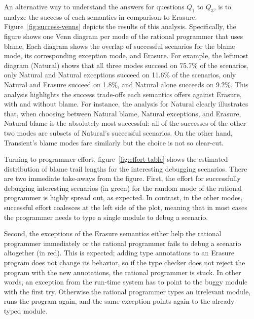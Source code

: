 An alternative way to understand the answers for questions $Q_1$ to $Q_3$, is to
analyze the success of each semantics in comparison to
Erasure. Figure~\ref{fig:success-venns} depicts the results of this analysis.
Specifically, the figure shows one Venn diagram per mode of the rational
programmer that uses blame.  Each diagram shows the overlap of successful
scenarios for the blame mode, its corresponding exception mode, and Erasure.
For example, the leftmost diagram (Natural) shows that all three modes succeed
on 75.7\% of the scenarios, only Natural and Natural exceptions succeed on
11.6\% of the scenarios, only Natural and Erasure succeed on 1.8\%, and Natural
alone succeeds on 9.2\%.  This analysis highlights the success trade-offs each
semantics offers against Erasure, with and without blame. For instance, the
analysis for Natural clearly illustrates that, when choosing between Natural
blame, Natural exceptions, and Erasure, Natural blame is the absolutely most
successful: all of the successes of the other two modes are subsets of Natural's
successful scenarios.  On the other hand, Transient's blame modes fare similarly
but the choice is not so clear-cut.

Turning to programmer effort, figure~\ref{fig:effort-table} shows the
estimated distribution of blame trail lengths for the interesting debugging
scenarios. There are two immediate take-aways from the figure. First, the effort for
successfully debugging interesting scenarios (in green) for the random
mode of the rational programmer is highly spread out, as
expected. In contrast, in the other modes, successful effort coalesces at
the left side of the plot, meaning that in most cases the programmer needs
to type a single module to debug a scenario. 

Second, the exceptions of the Erasure semantics either help the rational
programmer immediately or the rational programmer fails to debug a scenario
altogether (in red).  This is expected; adding type annotations to an Erasure
program does not change its behavior, so if the type checker does not reject the
program with the new annotations, the rational programmer is stuck.  In other
words, an exception from the run-time system has to point to the buggy module with the
first try. Otherwise the rational programmer types an irrelevant module, runs
the program again, and the same exception points again to the already typed
module.

